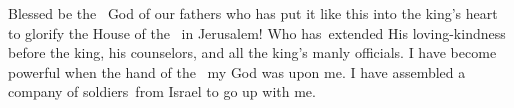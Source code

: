 \begin{inparaenum}\setcounter{enumi}{26}
   Blessed be the \lord\ God of our fathers who has put it like this into the king's heart to glorify the House of the \lord\ in Jerusalem!%
   Who has\understood\ extended His loving-kindness before the king, his counselors, and all the king's manly officials. I have become powerful when the hand of the \lord\ my God was upon me. I have assembled a company of soldiers\understood\ from Israel to go up with me.%
\end{inparaenum}
